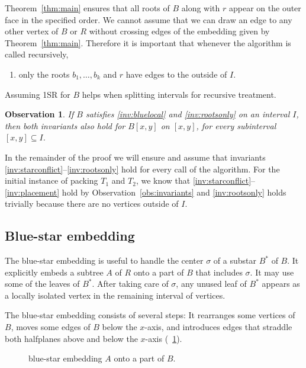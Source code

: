 \documentclass[11pt,a4paper,colorlinks=true,urlcolor=blue,citecolor=red]{article}
\theoremstyle{plain}
\newtheorem{observation}[theorem]{Observation}
\begin{document}
Theorem~\ref{thm:main} ensures that all roots of $B$ along with $r$
appear on the outer face in the specified order. We cannot assume that
we can draw an edge to any other vertex of $B$ or $R$ without crossing
edges of the embedding given by Theorem~\ref{thm:main}. Therefore it is
important that whenever the algorithm is called recursively,
\begin{enumerate}[leftmargin=*,label={(I\arabic*)},start=4]\setlength{\itemindent}{\labelsep}
\item\label{inv:rootsonly} only the roots $b_1,\ldots,b_k$ and $r$ have
  edges to the outside of $I$.
\end{enumerate}
Assuming 1SR for $B$ helps when splitting intervals for recursive
treatment.
\begin{observation}\label{obs:bluelocal}
  If $B$ satisfies \ref{inv:bluelocal} and \ref{inv:rootsonly} on an
  interval $I$, then both invariants also hold for $B[x,y]$ on $[x,y]$,
  for every subinterval $[x,y]\subseteq I$.
\end{observation}
In the remainder of the proof we will ensure and assume that invariants
\ref{inv:starconflict}--\ref{inv:rootsonly} hold for every call of the
algorithm. For the initial instance of packing $T_1$ and $T_2$, we know
that \ref{inv:starconflict}--\ref{inv:placement} hold by
Observation~\ref{obs:invariants} and \ref{inv:rootsonly} holds trivially
because there are no vertices outside of $I$.


\subsection{Blue-star embedding}
\label{sec:greedy_grab_embedding}
The blue-star embedding is useful to handle the center $\sigma$ of a
substar $B^*$ of $B$. It explicitly embeds a subtree $A$ of $R$ onto a
part of $B$ that includes $\sigma$. It may use some of the leaves of
$B^*$. After taking care of $\sigma$, any unused leaf of $B^*$ appears
as a locally isolated vertex in the remaining interval of vertices.

The blue-star embedding consists of several steps:
It rearranges some vertices of $B$, moves some edges of $B$ below the
$x$-axis, and introduces edges that straddle both halfplanes above and
below the $x$-axis (\figurename~\ref{fig:greedygrabex}).
\begin{figure}[htbp]
  \centering\hfil {}\hfil
  \hfil
  \hfil
  \caption{blue-star embedding $A$ onto a part of
    $B$.\label{fig:greedygrabex}}
\end{figure}
\end{document}
